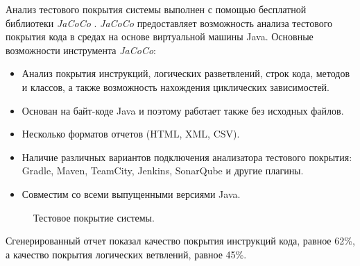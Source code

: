 \documentclass[a4paper,14pt]{extreport} %
\begin{document}
Анализ тестового покрытия системы выполнен с помощью бесплатной библиотеки \textit{JaCoCo} \cite{TEST_COVERAGE_LIB}. \textit{JaCoCo} предоставляет возможность анализа тестового покрытия кода в средах на основе виртуальной машины Java.
Основные возможности инструмента \textit{JaCoCo}:
\begin{itemize}
\item Анализ покрытия инструкций, логических разветвлений, строк кода, методов и классов, а также возможность нахождения циклических зависимостей.
\item Основан на байт-коде Java и поэтому работает также без исходных файлов.
\item Несколько форматов отчетов (HTML, XML, CSV).
\item Наличие различных вариантов подключения анализатора тестового покрытия: Gradle, Maven, TeamCity, Jenkins, SonarQube и другие  плагины.
\item Совместим со всеми выпущенными версиями Java.
\end{itemize}

\begin{figure}[H]
\caption{Тестовое покрытие системы.}
\label{test-coverage}
\end{figure}

Сгенерированный отчет показал качество покрытия инструкций кода, равное 62\%, а качество покрытия логических ветвлений, равное 45\%.
\end{document}
